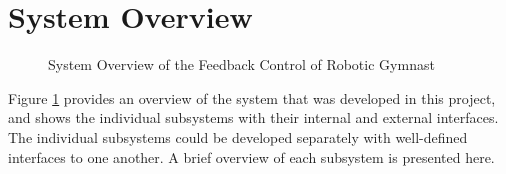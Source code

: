\section{System Overview}
\label{sec:system_overview}
\begin{figure}[h]
	\centering
	
	\caption{System Overview of the Feedback Control of Robotic Gymnast}
	\label{fig:system_overview}
\end{figure}


Figure \ref{fig:system_overview}  provides an overview of the system that was developed in this project, and shows the individual subsystems with their internal and external interfaces. The individual subsystems could be developed separately with well-defined interfaces to one another. A brief overview of each subsystem is presented here.\\

